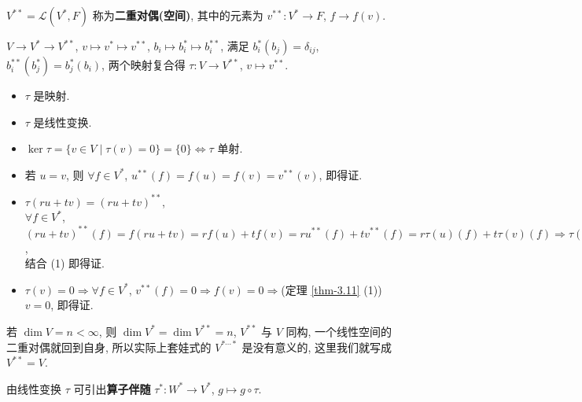 \documentclass{note}
\begin{document}
\begin{df}[二重对偶(空间)]
    $V^{**}=\mathcal{L}(V^*,F)$ 称为\textbf{二重对偶(空间)}, 其中的元素为 $v^{**}:V^*\rightarrow F$, $f\rightarrow f(v)$.
\end{df}

$V\rightarrow V^*\rightarrow V^{**}$, $v\mapsto v^*\mapsto v^{**}$, $b_i\mapsto b_i^*\mapsto b_i^{**}$, 满足 $b_i^*(b_j)=\delta_{ij}$, $b_i^{**}(b_j^*)=b_j^*(b_i)$, 两个映射复合得 $\tau:V\rightarrow V^{**}$, $v\mapsto v^{**}$.

\begin{itemize}
    \item[(1)] $\tau$ 是映射.
    \item[(2)] $\tau$ 是线性变换.
    \item[(3)] $\ker\tau=\{v\in V\mid\tau(v)=0\}=\{0\}\Longleftrightarrow\tau$ 单射.
\end{itemize}
\begin{pf}
    \begin{itemize}
        \item[(1)] 若 $u=v$, 则 $\forall f\in V^*$, $u^{**}(f)=f(u)=f(v)=v^{**}(v)$, 即得证.
        \item[(2)] $\tau(ru+tv)=(ru+tv)^{**}$,\\
        $\forall f\in V^*$, $(ru+tv)^{**}(f)=f(ru+tv)=rf(u)+tf(v)=ru^{**}(f)+tv^{**}(f)=r\tau(u)(f)+t\tau(v)(f)\Longrightarrow\tau(ru+tv)=r\tau(u)+t\tau(v)$,\\
        结合 (1) 即得证.
        \item[(3)] $\tau(v)=0\Longrightarrow\forall f\in V^*$, $v^{**}(f)=0\Longrightarrow f(v)=0\Longrightarrow$(定理 \ref{thm-3.11} (1)) $v=0$, 即得证.
    \end{itemize}
\end{pf}

\begin{cor}[(课本引理 3.13)]
    若 $\dim V=n<\infty$, 则 $\dim V^*=\dim V^{**}=n$, $V^{**}$ 与 $V$ 同构, 一个线性空间的二重对偶就回到自身, 所以实际上套娃式的 $V^{*\cdots*}$ 是没有意义的, 这里我们就写成 $V^{**}=V$.
\end{cor}

\begin{df}[算子伴随]
    由线性变换 $\tau$ 可引出\textbf{算子伴随} $\tau^*:W^*\rightarrow V^*$, $g\mapsto g\circ\tau$.
    \begin{center}
    \end{center}
\end{df}
\end{document}
